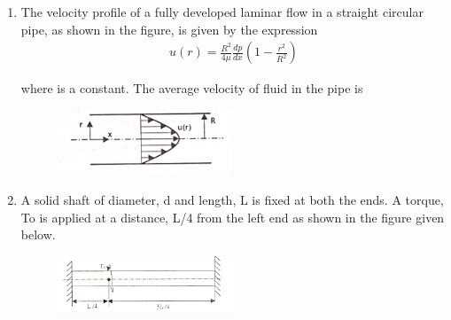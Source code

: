 \documentclass[journal]{IEEEtran}
\begin{document}
\begin{enumerate}[leftmargin=0pt]
\begin{enumerate}
\hfill{}
\end{enumerate}



\item The velocity profile of a fully developed laminar flow in a straight circular pipe, as shown in the figure, is given by the expression
\begin{align}
    u(r) = \frac{R^2}{4\mu} \frac{dp}{dx} \left(1 - \frac{r^2}{R^2}\right)
\end{align}


where is a constant. The average velocity of fluid in the pipe is
\begin{figure}[h]
  \centering
  \includegraphics[width=0.5\textwidth]{Figs/image (6).png}
  \caption{}
  \label{fig:34}
\end{figure}


\begin{enumerate}
\hfill{}
\end{enumerate}





\item A solid shaft of diameter, d and length, L is fixed at both the ends. A torque, To is applied at a distance,
L/4 from the left end as shown in the figure given below.


\begin{figure}[h]
  \centering
  \includegraphics[width=0.5\textwidth]{Figs/image (7).png}
  \caption{}
  \label{fig:35}
\end{figure}


\end{enumerate}
\end{document}
